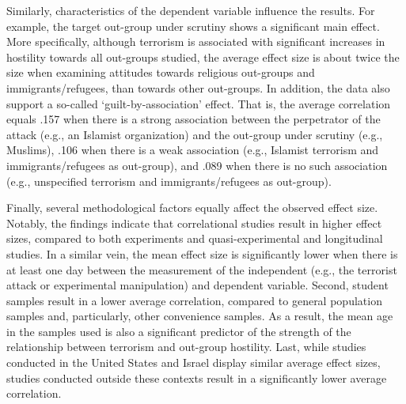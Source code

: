 Similarly, characteristics of the dependent variable influence the results. For example, the target out-group under scrutiny shows a significant main effect. More specifically, although terrorism is associated with significant increases in hostility towards all out-groups studied, the average effect size is about twice the size when examining attitudes towards religious out-groups and immigrants/refugees, than towards other out-groups. In addition, the data also support a so-called ‘guilt-by-association’ effect. That is, the average correlation equals .157 when there is a strong association between the perpetrator of the attack (e.g., an Islamist organization) and the out-group under scrutiny (e.g., Muslims), .106 when there is a weak association (e.g., Islamist terrorism and immigrants/refugees as out-group), and .089 when there is no such association (e.g., unspecified terrorism and immigrants/refugees as out-group). 


Finally, several methodological factors equally affect the observed effect size. Notably, the findings indicate that correlational studies result in higher effect sizes, compared to both experiments and quasi-experimental and longitudinal studies. In a similar vein, the mean effect size is significantly lower when there is at least one day between the measurement of the independent (e.g., the terrorist attack or experimental manipulation) and dependent variable. Second, student samples result in a lower average correlation, compared to general population samples and, particularly, other convenience samples. As a result, the mean age in the samples used is also a significant predictor of the strength of the relationship between terrorism and out-group hostility. Last, while studies conducted in the United States and Israel display similar average effect sizes, studies conducted outside these contexts result in a significantly lower average correlation. 

